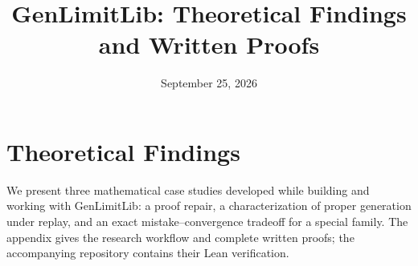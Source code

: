 \documentclass[11pt]{article}
\title{GenLimitLib: Theoretical Findings and Written Proofs}
\author{}
\date{September 25, 2026}
\theoremstyle{definition}
\theoremstyle{remark}
\theoremstyle{plain}
\begin{document}
\maketitle
\setcounter{section}{3}
\section{Theoretical Findings}
\label{sec:our-results}
We present three mathematical case studies developed while building and working
with GenLimitLib: a proof repair, a characterization of proper generation
under replay, and an exact mistake--convergence tradeoff for a special family.
The appendix gives the research workflow and complete written proofs; the
accompanying repository contains their Lean verification.


\appendix





\end{document}
